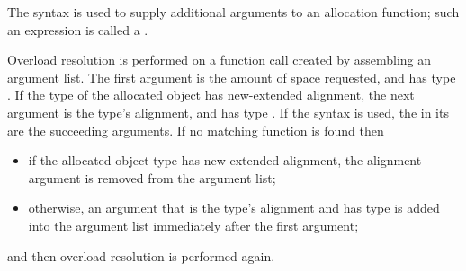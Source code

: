 \pnum
{}%
The  syntax is used to supply additional
arguments to an allocation function; such an expression is called
a .

\pnum
Overload resolution is
performed on a function call created by assembling an argument list.
The first argument is
the amount of space requested,
and has type .
If the type of the allocated object has new-extended alignment,
the next argument is
the type's alignment,
and has type .
If the  syntax is used,
the 
in its 
are the succeeding arguments.
If no matching function is found then
\begin{itemize}

\item
if the allocated object type has new-extended alignment,
the alignment argument is removed from the argument list;

\item
otherwise, an argument that
is the type's alignment and has type 
is added into the argument list immediately after the first argument;

\end{itemize}
and then overload resolution is performed again.

